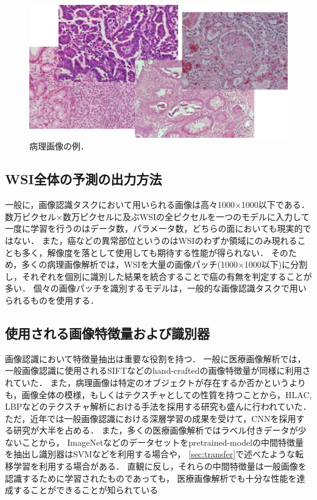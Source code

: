 \begin{figure}[tbp]
    \label{fig:path_images}
     \begin{center}
      \includegraphics[width=13cm]{figures/path_images.png}
     \end{center}
    \caption{病理画像の例．}
\end{figure}
    
\subsection{WSI全体の予測の出力方法}
一般に，画像認識タスクにおいて用いられる画像は高々1000×1000以下である．
数万ピクセル×数万ピクセルに及ぶWSIの全ピクセルを一つのモデルに入力して一度に学習を行うのはデータ数，パラメータ数，どちらの面においても現実的ではない．
また，癌などの異常部位というのはWSIのわずか領域にのみ現れることも多く，解像度を落として使用しても期待する性能が得られない．
そのため，多くの病理画像解析では，WSIを大量の画像パッチ(1000×1000以下)に分割し，それぞれを個別に識別した結果を統合することで癌の有無を判定することが多い．
個々の画像パッチを識別するモデルは，一般的な画像認識タスクで用いられるものを使用する．

\subsection{使用される画像特徴量および識別器}
画像認識において特徴量抽出は重要な役割を持つ．
一般に医療画像解析では，一般画像認識に使用されるSIFTなどのhand-craftedの画像特徴量が同様に利用されていた\cite{caicedo2009histopathology}．
また，病理画像は特定のオブジェクトが存在するか否かというよりも，画像全体の模様，もしくはテクスチャとしての性質を持つことから，HLAC, LBPなどのテクスチャ解析における手法を採用する研究も盛んに行われていた\cite{sertel2008texture, sertel2009histopathological, nosato2011extended}．
ただ，近年では一般画像認識における深層学習の成果を受けて，CNNを採用する研究が大半を占める\cite{hou2016patch, xu2016deep, litjens2016deep, chen2016dcan}．
また，多くの医療画像解析ではラベル付きデータが少ないことから，
ImageNetなどのデータセットをpretrained-modelの中間特徴量を抽出し識別器はSVMなどを利用する場合や，
\ref{sec:transfer}で述べたような転移学習を利用する場合がある．
直観に反し，それらの中間特徴量は一般画像を認識するために学習されたものであっても，
医療画像解析でも十分な性能を達成することができることが知られている\cite{li2014medical, tajbakhsh2016convolutional}

